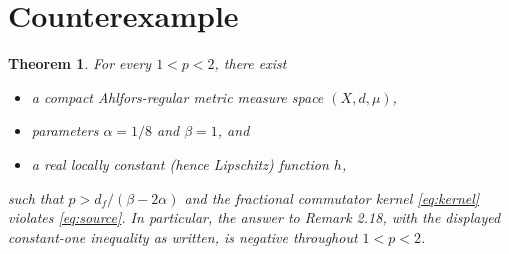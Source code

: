 \documentclass[11pt]{article}
\newtheorem{theorem}{Theorem}
\begin{document}
\section{Counterexample}

\begin{theorem}\label{thm:main}
For every $1<p<2$, there exist
\begin{itemize}
\item a compact Ahlfors-regular metric measure space $(X,d,\mu)$,
\item parameters $\alpha=1/8$ and $\beta=1$, and
\item a real locally constant (hence Lipschitz) function $h$,
\end{itemize}
such that $p>d_f/(\beta-2\alpha)$ and the fractional commutator kernel
\eqref{eq:kernel} violates \eqref{eq:source}.  In particular, the answer to
Remark 2.18, with the displayed constant-one inequality as written, is
negative throughout $1<p<2$.
\end{theorem}
\end{document}

